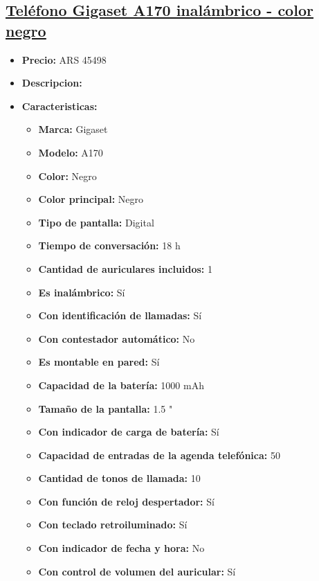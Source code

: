 \documentclass{article}
\begin{document}
    \begin{adjustwidth}{2em}{}

    \subsection{\underline{\href{https://www.mercadolibre.com.ar/telefono-gigaset-a170-inalambrico-color-negro/p/MLA15169105}{Teléfono Gigaset A170 inalámbrico - color negro}}}
    \begin{itemize}
        \item \textbf{Precio:} ARS 45498
        \item \textbf{Descripcion:} 
        \item \textbf{Caracteristicas:} 
        \begin{itemize}
            \item \textbf {Marca:} Gigaset
    \item \textbf {Modelo:} A170
    \item \textbf {Color:} Negro
    \item \textbf {Color principal:} Negro
    \item \textbf {Tipo de pantalla:} Digital
    \item \textbf {Tiempo de conversación:} 18 h
    \item \textbf {Cantidad de auriculares incluidos:} 1
    \item \textbf {Es inalámbrico:} Sí
    \item \textbf {Con identificación de llamadas:} Sí
    \item \textbf {Con contestador automático:} No
    \item \textbf {Es montable en pared:} Sí
    \item \textbf {Capacidad de la batería:} 1000 mAh
    \item \textbf {Tamaño de la pantalla:} 1.5 "
    \item \textbf {Con indicador de carga de batería:} Sí
    \item \textbf {Capacidad de entradas de la agenda telefónica:} 50
    \item \textbf {Cantidad de tonos de llamada:} 10
    \item \textbf {Con función de reloj despertador:} Sí
    \item \textbf {Con teclado retroiluminado:} Sí
    \item \textbf {Con indicador de fecha y hora:} No
    \item \textbf {Con control de volumen del auricular:} Sí
        \end{itemize}
    \end{itemize}

    \vspace{1\baselineskip} %
    \end{adjustwidth}
\end{document}
